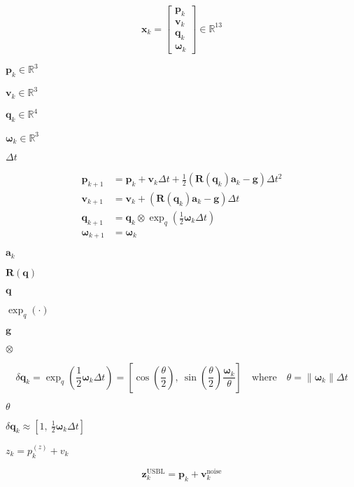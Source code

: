 \documentclass{article}
\begin{document}
\[
\mathbf{x}_k =
\begin{bmatrix}
\mathbf{p}_k \\
\mathbf{v}_k \\
\mathbf{q}_k \\
\boldsymbol{\omega}_k
\end{bmatrix}
\in \mathbb{R}^{13}
\]
\pagebreak

$ \mathbf{p}_k \in \mathbb{R}^3 $
\pagebreak

$ \mathbf{v}_k \in \mathbb{R}^3 $
\pagebreak

$ \mathbf{q}_k \in \mathbb{R}^4 $
\pagebreak

$ \boldsymbol{\omega}_k \in \mathbb{R}^3 $
\pagebreak

$ \Delta t $
\pagebreak

\[
\begin{aligned}
\mathbf{p}_{k+1} &= \mathbf{p}_k + \mathbf{v}_k \Delta t + \frac{1}{2}(\mathbf{R}(\mathbf{q}_k)\mathbf{a}_k - \mathbf{g}) \Delta t^2 \\
\mathbf{v}_{k+1} &= \mathbf{v}_k + (\mathbf{R}(\mathbf{q}_k)\mathbf{a}_k - \mathbf{g}) \Delta t \\
\mathbf{q}_{k+1} &= \mathbf{q}_k \otimes \exp_q\left( \frac{1}{2} \boldsymbol{\omega}_k \Delta t \right) \\
\boldsymbol{\omega}_{k+1} &= \boldsymbol{\omega}_k
\end{aligned}
\]
\pagebreak

$ \mathbf{a}_k $
\pagebreak

$ \mathbf{R}(\mathbf{q}) $
\pagebreak

$ \mathbf{q} $
\pagebreak

$ \exp_q(\cdot) $
\pagebreak

$ \mathbf{g} $
\pagebreak

$ \otimes $
\pagebreak

\[
\delta \mathbf{q}_k = \exp_q\left( \frac{1}{2} \boldsymbol{\omega}_k \Delta t \right)
= \left[ \cos\left(\frac{\theta}{2}\right),\ \sin\left(\frac{\theta}{2}\right) \frac{\boldsymbol{\omega}_k}{\theta} \right]
\quad \text{where} \quad \theta = \|\boldsymbol{\omega}_k\| \Delta t
\]
\pagebreak

$ \theta $
\pagebreak

$ \delta \mathbf{q}_k \approx [1,\ \frac{1}{2} \boldsymbol{\omega}_k \Delta t] $
\pagebreak

$ z_k = p_k^{(z)} + v_k $
\pagebreak

\[
  \mathbf{z}_k^{\text{USBL}} = \mathbf{p}_k + \mathbf{v}_k^{\text{noise}}
  \]
\pagebreak
\end{document}
